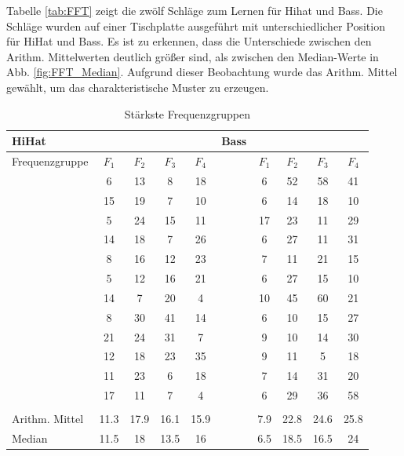 Tabelle \ref{tab:FFT} zeigt die zwölf Schläge zum Lernen für Hihat und Bass.
Die Schläge wurden auf einer Tischplatte ausgeführt mit unterschiedlicher Position für HiHat und Bass.
Es ist zu erkennen, dass die Unterschiede zwischen den Arithm. Mittelwerten deutlich größer sind, als zwischen den Median-Werte in Abb. \ref{fig:FFT_Median}. Aufgrund dieser Beobachtung wurde das Arithm. Mittel gewählt, um das charakteristische Muster zu erzeugen. 

\begin{table}[H]
	\centering
	\caption{Stärkste Frequenzgruppen}
	\begin{tabular}{l c c c c | l c c c c}
		HiHat &&&& &Bass \\
		\hline
		Frequenzgruppe & $F_1$ & $F_2$ & $F_3$ & $F_4$  & & $F_1$ & $F_2$ & $F_3$ & $F_4$\\	
		
        & 6	 & 13  & 8  & 18 && 6  & 52 &	58 & 41\\
        & 15 &	19 & 7  & 10 && 6  & 14 &	18 & 10\\
        & 5  &	24 & 15	& 11 && 17 & 23 &	11 & 29\\
        & 14 &	18 & 7  & 26 && 6  & 27 &	11 & 31\\
        & 8	 &  16 & 12 & 23 && 7  & 11 &	21 & 15\\
        & 5  &	12 & 16 & 21 && 6  & 27 &	15 & 10\\
        & 14 &	7  & 20	& 4  && 10 & 45 &	60 & 21\\
        & 8	 &  30 & 41 & 14 &&  6 & 10 &	15 & 27\\
        & 21 &	24 & 31 & 7  &&  9 & 10 &	14 & 30\\
        & 12 &	18 & 23 & 35 &&  9 & 11 &	5  & 18\\
        & 11 &	23 &  6 & 18 &&  7 & 14 &	31 & 20\\
        & 17 &	11 &  7 &  4 &&  6 & 29 &	36 & 58\\
        		\\
		\hline
		Arithm. Mittel & 11.3 & 17.9 & 16.1 &	15.9  && 7.9 & 22.8 &	24.6 &	25.8\\
		Median       & 11.5 & 18   & 13.5 &	16    && 6.5 & 18.5 &	16.5 &	24\\		 

 
        

\end{tabular}
\end{table}
